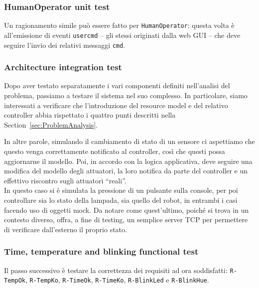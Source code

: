 \documentclass{../llncs}
\newcommand{\codescript}[1]{{\mbox{\small{\texttt{#1}}}}\xspace}
\newcommand{\code}[1]{{\color{blue}\small{\texttt{#1}}}}
\newcommand{\xs}[1]{\sectionname~\ref{sec:#1}}
\newcommand{\labelsssec}[1]{\label{sssec:#1}}
\newcommand{\sectionname}{Section}
\begin{document}


\subsubsection{HumanOperator unit test}
Un ragionamento simile può essere fatto per \texttt{HumanOperator}: questa volta è all'emissione di eventi \codescript{usercmd} -- gli stessi originati dalla web GUI -- che deve seguire l'invio dei relativi messaggi \codescript{cmd}.\\



\subsubsection{Architecture integration test}
Dopo aver testato separatamente i vari componenti definiti nell'analisi del problema, passiamo a testare il sistema nel suo complesso. In particolare, siamo interessati a verificare che l'introduzione del resource model e del relativo controller abbia rispettato i quattro punti descritti nella \xs{ProblemAnalysis}.

In altre parole, simulando il cambiamento di stato di un sensore ci aspettiamo che questo venga correttamente notificato al controller, così che questi possa aggiornarne il modello. Poi, in accordo con la logica applicativa, deve seguire una modifica del modello degli attuatori, la loro notifica da parte del controller e un effettivo riscontro sugli attuatori ``reali''.\\



In questo caso si è simulata la pressione di un pulsante sulla console, per poi controllare sia lo stato della lampada, sia quello del robot, in entrambi i casi facendo uso di oggetti mock. Da notare come quest'ultimo, poiché si trova in un contesto diverso, offra, a fine di testing, un semplice server TCP per permettere di verificare dall'esterno il proprio stato.

\subsubsection{Time, temperature and blinking functional test}
\labelsssec{timeTempBlinkFTest}
Il passo successivo è testare la correttezza dei requisiti ad ora soddisfatti: \code{R-TempOk}, \code{R-TempKo}, \code{R-TimeOk}, \code{R-TimeKo}, \code{R-BlinkLed} e \code{R-BlinkHue}.
\end{document}
